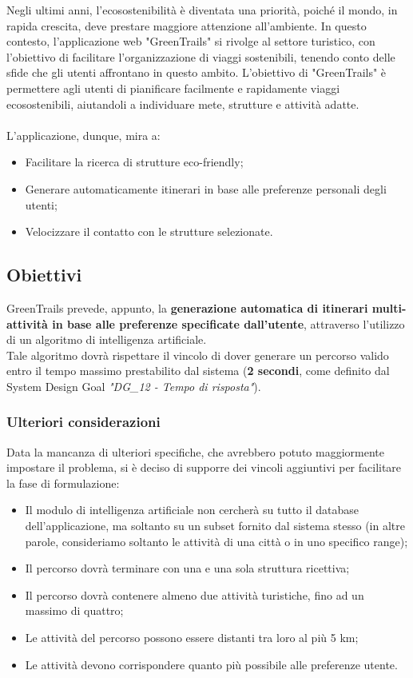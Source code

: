 \documentclass{CSUniSchoolLabReport}
\begin{document}
Negli ultimi anni, l'ecosostenibilità è diventata una priorità, poiché il mondo, in rapida crescita, deve prestare maggiore attenzione all'ambiente. In questo contesto, l'applicazione web "GreenTrails" si rivolge al settore turistico, con l'obiettivo di facilitare l'organizzazione di viaggi sostenibili, tenendo conto delle sfide che gli utenti affrontano in questo ambito.
L'obiettivo di "GreenTrails" è permettere agli utenti di pianificare facilmente e rapidamente viaggi ecosostenibili, aiutandoli a individuare mete, strutture e attività adatte. \\\\
L'applicazione, dunque, mira a:
\begin{itemize}
    \item Facilitare la ricerca di strutture eco-friendly;
    \item Generare automaticamente itinerari in base alle preferenze personali degli utenti;
    \item Velocizzare il contatto con le strutture selezionate.
\end{itemize}


\subsection{Obiettivi}

GreenTrails prevede, appunto, la \textbf{generazione automatica di itinerari multi-attività in base alle preferenze specificate dall'utente}, attraverso l'utilizzo di un algoritmo di intelligenza artificiale. \\
Tale algoritmo dovrà rispettare il vincolo di dover generare un percorso valido entro il tempo massimo prestabilito dal sistema (\textbf{2 secondi}, come definito dal System Design Goal \textit{"DG\_12 - Tempo di risposta"}). 

\subsubsection{Ulteriori considerazioni}

Data la mancanza di ulteriori specifiche, che avrebbero potuto maggiormente impostare il problema, si è deciso di supporre dei vincoli aggiuntivi per facilitare la fase di formulazione:
\begin{itemize}
	\item Il modulo di intelligenza artificiale non cercherà su tutto il database dell'applicazione, ma soltanto su un subset fornito dal sistema stesso (in altre parole, consideriamo soltanto le attività di una città o in uno specifico range);
	\item Il percorso dovrà terminare con una e una sola struttura ricettiva;
	\item Il percorso dovrà contenere almeno due attività turistiche, fino ad un massimo di quattro;
	\item Le attività del percorso possono essere distanti tra loro al più 5 km;
	\item Le attività devono corrispondere quanto più possibile alle preferenze utente.
\end{itemize}
\end{document}
